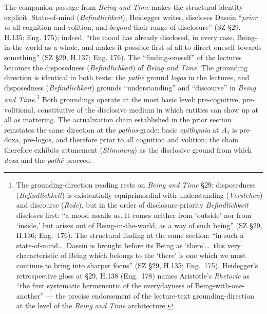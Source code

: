 \documentclass{article}
\begin{document}
 The companion passage from \textit{Being and Time} makes the structural identity explicit. State-of-mind (\textit{Befindlichkeit}), Heidegger writes, discloses Dasein ``\textit{prior to} all cognition and volition, and \textit{beyond} their range of disclosure'' (SZ \S29, H.135; Eng. 175); indeed, ``the mood has already disclosed, in every case, Being-in-the-world as a whole, and makes it possible first of all to direct oneself towards something'' (SZ \S29, H.137; Eng. 176). The ``finding-oneself'' of the lectures becomes the disposedness (\textit{Befindlichkeit}) of \textit{Being and Time}. The grounding direction is identical in both texts: the \textit{pathē} ground \textit{logos} in the lectures, and disposedness (\textit{Befindlichkeit}) grounds ``understanding'' and ``discourse'' in \textit{Being and Time}.\footnote{The grounding-direction reading rests on \textit{Being and Time} \S 29: disposedness (\textit{Befindlichkeit}) is existentially equiprimordial with understanding (\textit{Verstehen}) and discourse (\textit{Rede}), but in the order of disclosure-priority \textit{Befindlichkeit} discloses first: ``a mood assails us. It comes neither from `outside' nor from `inside,' but arises out of Being-in-the-world, as a way of such being'' (SZ \S 29, H.136; Eng.~176). The structural finding at the same section: ``in such a state-of-mind\ldots\ Dasein is brought before its Being as `there'\ldots\ this very characteristic of Being which belongs to the `there' is one which we must continue to bring into sharper focus'' (SZ \S 29, H.135; Eng.~175). Heidegger's retrospective gloss at \S 29, H.138 (Eng.~178) names Aristotle's \textit{Rhetoric} as ``the first systematic hermeneutic of the everydayness of Being-with-one-another'' --- the precise endorsement of the lecture-text grounding-direction at the level of the \textit{Being and Time} architecture.} Both groundings operate at the most basic level: pre-cognitive, pre-volitional, constitutive of the disclosive medium in which entities can show up at all as mattering. The actualization chain established in the prior section reinstates the same direction at the \textit{pathos}-grade: basic \textit{epithymia} at $A_1$ is pre-doxa, pre-logos, and therefore prior to all cognition and volition; the chain therefore exhibits attunement (\textit{Stimmung}) as the disclosive ground from which \textit{doxa} and the \textit{pathē} proceed.
\end{document}
